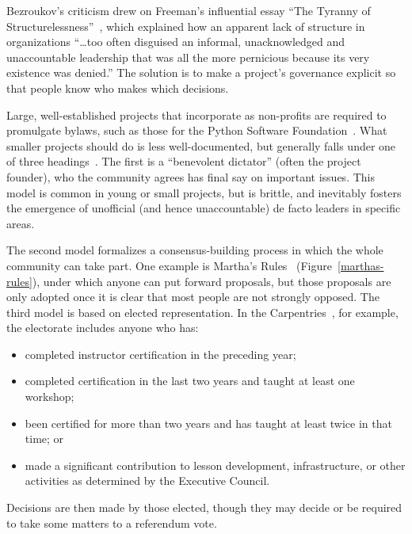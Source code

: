 \documentclass[10pt,letterpaper]{article}
\begin{document}
Bezroukov's criticism drew on Freeman's influential essay ``The Tyranny of Structurelessness''~\cite{freeman1972},
which explained how an apparent lack of structure in organizations ``{\ldots}too often disguised an informal,
unacknowledged and unaccountable leadership that was all the more pernicious because its very existence was denied.''
The solution is to make a project's governance explicit
so that people know who makes which decisions.

Large, well-established projects that incorporate as non-profits are required to promulgate bylaws,
such as those for the Python Software Foundation~\cite{psf-bylaws}.
What smaller projects should do is less well-documented,
but generally falls under one of three headings~\cite{fogel2005}.
The first is a ``benevolent dictator'' (often the project founder),
who the community agrees has final say on important issues.
This model is common in young or small projects,
but is brittle,
and inevitably fosters the emergence of unofficial (and hence unaccountable) de facto leaders
in specific areas.

The second model formalizes a consensus-building process
in which the whole community can take part.
One example is Martha's Rules~\cite{minahan1986} (Figure~\ref{marthas-rules}),
under which anyone can put forward proposals,
but those proposals are only adopted once it is clear that most people are not strongly opposed.
The third model is based on elected representation.
In the Carpentries~\cite{carpentries-bylaws},
for example,
the electorate includes anyone who has:

\begin{itemize}

\item
  completed instructor certification in the preceding year;

\item
  completed certification in the last two years and taught at least one workshop;

\item
  been certified for more than two years and has taught at least twice in that time;
  or

\item
  made a significant contribution to lesson development, infrastructure, or other activities
  as determined by the Executive Council.

\end{itemize}

\noindent
Decisions are then made by those elected,
though they may decide or be required to take some matters to a referendum vote.
\end{document}
